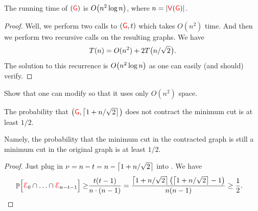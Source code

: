 



\begin{lemma}
    The running time of \FastCut{}$({\textcolor{red}{\mathsf{G}}})$ is $O\pth{n^{2}\log n}$, where
    $n=\left| {{\textcolor{red}{\mathsf{V}}}({\textcolor{red}{\mathsf{G}}})} \right|$.
    
\end{lemma}
\begin{proof}
    Well, we perform two calls to \Contract{}$({\textcolor{red}{\mathsf{G}}},t)$ which takes
    $O(n^{2})$ time. And then we perform two recursive calls on the
    resulting graphs.  We have
    \begin{equation*}
        T(n)=O(n^{2}) + 2 T\bigl(  n/ \sqrt{2} \hspace{0.6pt} \bigr).
    \end{equation*}
    The solution to this recurrence is $O\pth{n^{2}\log n}$ as one can
    easily (and should) verify.
\end{proof}



\begin{exercise}
    Show that one can modify \FastCut{} so that it uses only
    $O(n^{2})$ space.
\end{exercise}

\begin{lemma}
    The probability that
    \Contract{}$\bigl( {\textcolor{red}{\mathsf{G}}}, \left\lceil {1 + n/\sqrt{2}} \right\rceil \hspace{0.6pt} \bigr)$ does not
    contract the minimum cut is at least $1/2$.
    
    Namely, the probability that the minimum cut in the contracted
    graph is still a minimum cut in the original graph is at least
    $1/2$.
    
\end{lemma}
\begin{proof}
    Just plug in $\nu= n -t = n - \left\lceil {1 + n/\sqrt{2} } \right\rceil$ into
    . We have
    \begin{align*}
        \Prob{\Bigl. \Event_{0}\cap\ldots\cap\Event_{n-t-1}}\geq &
        \frac{t(t-1)}{n\cdot(n-1)} = \frac{\ceil{1 + n/\sqrt{2} }
           \pth{ \ceil{1 + n/\sqrt{2} } - 1}}{n(n-1)} \geq
        \frac{1}{2}.
    \end{align*}%
\end{proof}

